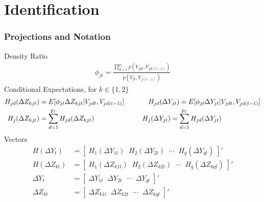 \documentclass[9pt]{beamer}
\begin{document}
\section{Identification}
\begin{frame} 
\frametitle{Projections and Notation} 
Density Ratio
\begin{align*} 
\phi_{jt} = \frac{ \prod_{d=1}^{p_1}p(V_{jdt},V_{jd(t-1)}) }{p(V_{jt},V_{j(t-1)})} 
\end{align*}
Conditional Expectations, for $k \in \{1,2\}$
\begin{align*} 
H_{jd}(\Delta Z_{kjt}) &= E[\phi_{jt} \Delta Z_{kjt} |V_{jdt},V_{jd(t-1)}] \hspace{1.25cm} 
%
H_{jd}(\Delta Y_{jt}) = E[\phi_{jt} \Delta Y_{jt} |V_{jdt},V_{jd(t-1)}] \\
%
H_j(\Delta Z_{kjt}) &= \sum_{d=1}^{p_1} H_{jd}(\Delta Z_{kjt})  \hspace{2.5cm}
%
H_j(\Delta Y_{jt}) = \sum_{d=1}^{p_1} H_{jd}(\Delta Y_{jt})  \end{align*} 
Vectors
\begin{align*}
H(\Delta Y_t)  &= [ \; H_1(\Delta Y_{1t}) \;\; H_2(\Delta Y_{2t}) \;\; \cdots \;\; H_q(\Delta Y_{qt}) \; ]' \\[7pt]
%
H(\Delta Z_{kt})  &= [ \; H_1(\Delta Z_{k1t}) \;\; H_2(\Delta Z_{k2t}) \;\; \cdots \;\; H_q(\Delta Z_{kqt}) \; ]' \\[7pt]
%
\Delta Y_t &= [ \; \Delta Y_{1t} \;\;  \Delta Y_{2t} \;\; \cdots \;\; \Delta Y_{qt} \;] ' \\[7pt]
\Delta Z_{kt} &= [ \; \Delta Z_{k1t} \;\;  \Delta Z_{k2t} \;\; \cdots \;\; \Delta Z_{kqt} \;] ' 
\end{align*}

\end{frame}
\end{document}
